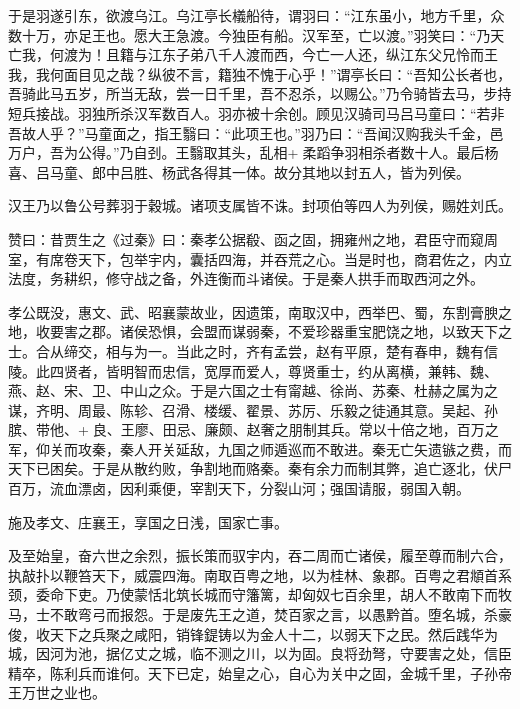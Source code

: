 \documentclass[12pt,UTF8]{ctexbook}
\begin{document}
于是羽遂引东，欲渡乌江。乌江亭长檥船待，谓羽曰：“江东虽小，地方千里，众数十万，亦足王也。愿大王急渡。今独臣有船。汉军至，亡以渡。”羽笑曰：“乃天亡我，何渡为！且籍与江东子弟八千人渡而西，今亡一人还，纵江东父兄怜而王我，我何面目见之哉？纵彼不言，籍独不愧于心乎！”谓亭长曰：“吾知公长者也，吾骑此马五岁，所当无敌，尝一日千里，吾不忍杀，以赐公。”乃令骑皆去马，步持短兵接战。羽独所杀汉军数百人。羽亦被十余创。顾见汉骑司马吕马童曰：“若非吾故人乎？”马童面之，指王翳曰：“此项王也。”羽乃曰：“吾闻汉购我头千金，邑万户，吾为公得。”乃自刭。王翳取其头，乱相+柔蹈争羽相杀者数十人。最后杨喜、吕马童、郎中吕胜、杨武各得其一体。故分其地以封五人，皆为列侯。



汉王乃以鲁公号葬羽于穀城。诸项支属皆不诛。封项伯等四人为列侯，赐姓刘氏。



赞曰：昔贾生之《过秦》曰：秦孝公据殽、函之固，拥雍州之地，君臣守而窥周室，有席卷天下，包举宇内，囊括四海，并吞荒之心。当是时也，商君佐之，内立法度，务耕织，修守战之备，外连衡而斗诸侯。于是秦人拱手而取西河之外。



孝公既没，惠文、武、昭襄蒙故业，因遗策，南取汉中，西举巴、蜀，东割膏腴之地，收要害之郡。诸侯恐惧，会盟而谋弱秦，不爱珍器重宝肥饶之地，以致天下之士。合从缔交，相与为一。当此之时，齐有孟尝，赵有平原，楚有春申，魏有信陵。此四贤者，皆明智而忠信，宽厚而爱人，尊贤重士，约从离横，兼韩、魏、燕、赵、宋、卫、中山之众。于是六国之士有甯越、徐尚、苏秦、杜赫之属为之谋，齐明、周最、陈轸、召滑、楼缓、翟景、苏厉、乐毅之徒通其意。吴起、孙膑、带他、+良、王廖、田忌、廉颇、赵奢之朋制其兵。常以十倍之地，百万之军，仰关而攻秦，秦人开关延敌，九国之师遁巡而不敢进。秦无亡矢遗镞之费，而天下已困矣。于是从散约败，争割地而赂秦。秦有余力而制其弊，追亡逐北，伏尸百万，流血漂卤，因利乘便，宰割天下，分裂山河；强国请服，弱国入朝。



施及孝文、庄襄王，享国之日浅，国家亡事。



及至始皇，奋六世之余烈，振长策而驭宇内，吞二周而亡诸侯，履至尊而制六合，执敲扑以鞭笞天下，威震四海。南取百粤之地，以为桂林、象郡。百粤之君頫首系颈，委命下吏。乃使蒙恬北筑长城而守籓篱，却匈奴七百余里，胡人不敢南下而牧马，士不敢弯弓而报怨。于是废先王之道，焚百家之言，以愚黔首。堕名城，杀豪俊，收天下之兵聚之咸阳，销锋鍉铸以为金人十二，以弱天下之民。然后践华为城，因河为池，据亿丈之城，临不测之川，以为固。良将劲弩，守要害之处，信臣精卒，陈利兵而谁何。天下已定，始皇之心，自心为关中之固，金城千里，子孙帝王万世之业也。
\end{document}
